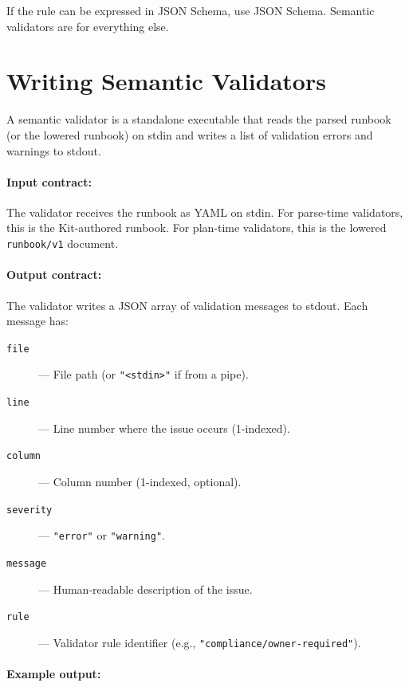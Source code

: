 If the rule can be expressed in JSON Schema, use JSON Schema. Semantic
validators are for everything else.

\section{Writing Semantic Validators}
\label{sec:writing-validators}

A semantic validator is a standalone executable that reads the parsed runbook
(or the lowered runbook) on stdin and writes a list of validation errors and
warnings to stdout.

\paragraph{Input contract:}

The validator receives the runbook as YAML on stdin. For parse-time validators,
this is the Kit-authored runbook. For plan-time validators, this is the lowered
\texttt{runbook/v1} document.

\paragraph{Output contract:}

The validator writes a JSON array of validation messages to stdout. Each message
has:

\begin{description}
  \item[\texttt{file}] --- File path (or \texttt{"<stdin>"} if from a pipe).
  \item[\texttt{line}] --- Line number where the issue occurs (1-indexed).
  \item[\texttt{column}] --- Column number (1-indexed, optional).
  \item[\texttt{severity}] --- \texttt{"error"} or \texttt{"warning"}.
  \item[\texttt{message}] --- Human-readable description of the issue.
  \item[\texttt{rule}] --- Validator rule identifier (e.g.,
    \texttt{"compliance/owner-required"}).
\end{description}

\paragraph{Example output:}

